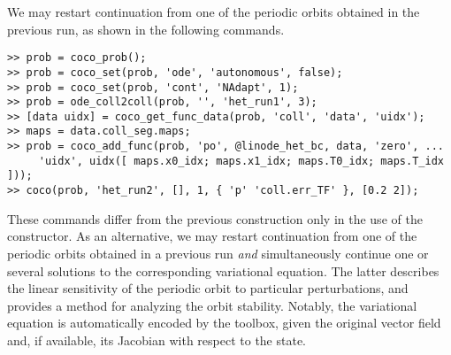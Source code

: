 We may restart continuation from one of the periodic orbits obtained in the previous run, as shown in the following commands.
\begin{lstlisting}[language=coco-highlight]
>> prob = coco_prob();
>> prob = coco_set(prob, 'ode', 'autonomous', false);
>> prob = coco_set(prob, 'cont', 'NAdapt', 1);
>> prob = ode_coll2coll(prob, '', 'het_run1', 3);
>> [data uidx] = coco_get_func_data(prob, 'coll', 'data', 'uidx');
>> maps = data.coll_seg.maps;
>> prob = coco_add_func(prob, 'po', @linode_het_bc, data, 'zero', ...
     'uidx', uidx([ maps.x0_idx; maps.x1_idx; maps.T0_idx; maps.T_idx ]));
>> coco(prob, 'het_run2', [], 1, { 'p' 'coll.err_TF' }, [0.2 2]);
\end{lstlisting}
These commands differ from the previous construction only in the use of the  constructor. As an alternative, we may restart continuation from one of the periodic orbits obtained in a previous run \emph{and} simultaneously continue one or several solutions to the corresponding variational equation. The latter describes the linear sensitivity of the periodic orbit to particular perturbations, and provides a method for analyzing the orbit stability. Notably, the variational equation is automatically encoded by the  toolbox, given the original vector field and, if available, its Jacobian with respect to the state.

